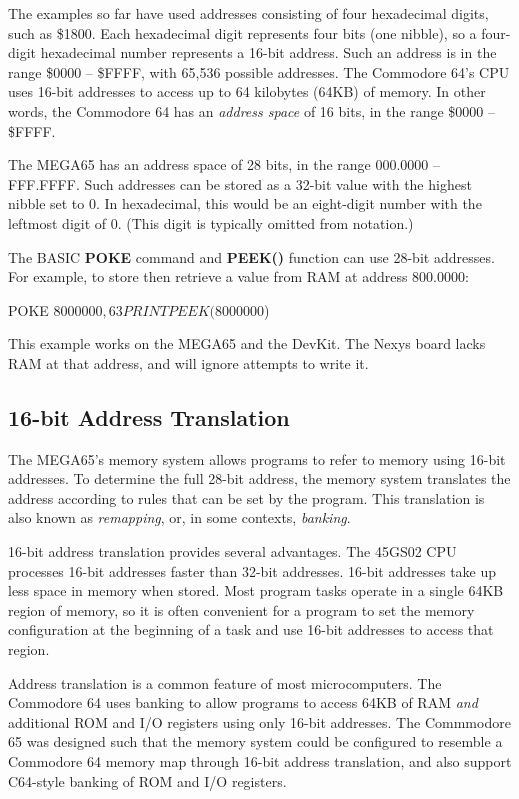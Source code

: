 The examples so far have used addresses consisting of four hexadecimal digits, such as \$1800. Each hexadecimal digit represents four bits (one nibble), so a four-digit hexadecimal number represents a 16-bit address. Such an address is in the range \$0000 -- \$FFFF, with 65,536 possible addresses. The Commodore 64's CPU uses 16-bit addresses to access up to 64 kilobytes (64KB) of memory. In other words, the Commodore 64 has an \emph{address space} of 16 bits, in the range \$0000 -- \$FFFF.

The MEGA65 has an address space of 28 bits, in the range 000.0000 -- FFF.FFFF. Such addresses can be stored as a 32-bit value with the highest nibble set to 0. In hexadecimal, this would be an eight-digit number with the leftmost digit of 0. (This digit is typically omitted from notation.)

The BASIC {\bf POKE} command and {\bf PEEK()} function can use 28-bit addresses. For example, to store then retrieve a value from RAM at address 800.0000:

\begin{basiccode}
POKE $8000000,63
PRINT PEEK($8000000)
\end{basiccode}

This example works on the MEGA65 and the DevKit. The Nexys board lacks RAM at that address, and will ignore attempts to write it.

\subsection{16-bit Address Translation}

The MEGA65's memory system allows programs to refer to memory using 16-bit addresses. To determine the full 28-bit address, the memory system translates the address according to rules that can be set by the program. This translation is also known as {\em remapping}, or, in some contexts, {\em banking}.

16-bit address translation provides several advantages. The 45GS02 CPU processes 16-bit addresses faster than 32-bit addresses. 16-bit addresses take up less space in memory when stored. Most program tasks operate in a single 64KB region of memory, so it is often convenient for a program to set the memory configuration at the beginning of a task and use 16-bit addresses to access that region.

Address translation is a common feature of most microcomputers. The Commodore 64 uses banking to allow programs to access 64KB of RAM {\em and} additional ROM and I/O registers using only 16-bit addresses. The Commmodore 65 was designed such that the memory system could be configured to resemble a Commodore 64 memory map through 16-bit address translation, and also support C64-style banking of ROM and I/O registers.

